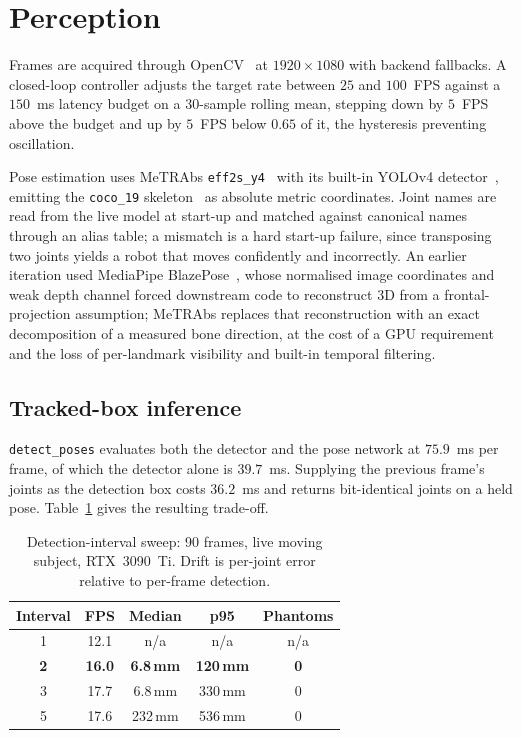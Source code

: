 \documentclass[twocolumn]{article}
\begin{document}
\section{Perception}

Frames are acquired through OpenCV~\cite{bradski2000opencv} at $1920\times1080$ with backend
fallbacks. A closed-loop controller adjusts the target rate between $25$ and $100$~FPS against
a $150$~ms latency budget on a 30-sample rolling mean, stepping down by $5$~FPS above the
budget and up by $5$~FPS below $0.65$ of it, the hysteresis preventing oscillation.

Pose estimation uses MeTRAbs \texttt{eff2s\_y4}~\cite{sarandi2021metrabs, abadi2016tensorflow}
with its built-in YOLOv4 detector~\cite{bochkovskiy2020yolov4}, emitting the \texttt{coco\_19}
skeleton~\cite{lin2014coco} as absolute metric coordinates. Joint names are read from the live
model at start-up and matched against canonical names through an alias table; a mismatch is a
hard start-up failure, since transposing two joints yields a robot that moves confidently and
incorrectly. An earlier iteration used MediaPipe BlazePose~\cite{bazarevsky2020blazepose},
whose normalised image coordinates and weak depth channel forced downstream code to reconstruct
3D from a frontal-projection assumption; MeTRAbs replaces that reconstruction with an exact
decomposition of a measured bone direction, at the cost of a GPU requirement and the loss of
per-landmark visibility and built-in temporal filtering.

\subsection{Tracked-box inference}

\texttt{detect\_poses} evaluates both the detector and the pose network at $75.9$~ms per frame,
of which the detector alone is $39.7$~ms. Supplying the previous frame's joints as the
detection box costs $36.2$~ms and returns bit-identical joints on a held pose.
Table~\ref{tab:detint} gives the resulting trade-off.

\begin{table}[H]
\centering
\caption{Detection-interval sweep: 90 frames, live moving subject, RTX~3090~Ti. Drift is
per-joint error relative to per-frame detection.}
\label{tab:detint}
\small
\begin{tabular}{@{}ccccc@{}}
\toprule
Interval & FPS & Median & p95 & Phantoms \\
\midrule
1 & 12.1 & n/a & n/a & n/a \\
\textbf{2} & \textbf{16.0} & \textbf{6.8\,mm} & \textbf{120\,mm} & \textbf{0} \\
3 & 17.7 & 6.8\,mm & 330\,mm & 0 \\
5 & 17.6 & 232\,mm & 536\,mm & 0 \\
\bottomrule
\end{tabular}
\end{table}
\end{document}
